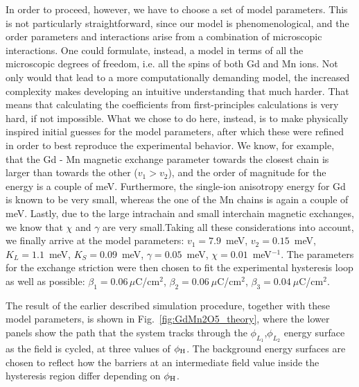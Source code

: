 In order to proceed, however, we have to choose a set of model parameters. This is not particularly straightforward, since our model is phenomenological, and the order parameters and interactions arise from a combination of microscopic interactions.
One could formulate, instead, a model in terms of all the microscopic degrees of freedom, i.e. all the spins of both Gd and Mn ions.
Not only would that lead to a more computationally demanding model, the increased complexity makes developing an intuitive understanding that much harder.
That means that calculating the coefficients from first-principles calculations is very hard, if not impossible.
What we chose to do here, instead, is to make physically inspired initial guesses for the model parameters, after which these were refined in order to best reproduce the experimental behavior.
We know, for example, that the Gd - Mn magnetic exchange parameter towards the closest chain is larger than towards the other ($v_1>v_2$), and the order of magnitude for the energy is a couple of meV.
Furthermore, the single-ion anisotropy energy for Gd is known to be very small, whereas the one of the Mn chains is again a couple of meV.
Lastly, due to the large intrachain and small interchain magnetic exchanges, we know that $\chi$ and $\gamma$ are very small.Taking all these considerations into account, we finally arrive at the model parameters:  
$v_1 = 7.9$~meV, $v_2 = 0.15$~meV, $K_L = 1.1$~meV, $K_S = 0.09$~meV, $\gamma = 0.05$~meV, $\chi=0.01$~meV$^{-1}$.
The parameters for the exchange striction were then chosen to fit the experimental hysteresis loop as well as possible:
${\beta_1 = 0.06\,\mu}$C/cm$^2$, $\beta_2 = 0.06\:\mu$C/cm$^2$, $\beta_3 = 0.04\:\mu$C/cm$^2$.

The result of the earlier described simulation procedure, together with these model parameters, is shown in Fig.~\ref{fig:GdMn2O5_theory}, where the lower panels show the path that the system tracks through the $\phi_{L_1}$,$\phi_{L_2}$ energy surface as the field is cycled, at three values of $\phi_{\rm H}$.
The background energy surfaces are chosen to reflect how the barriers at an intermediate field value inside the hysteresis region differ depending on $\phi_{\rm H}$.

